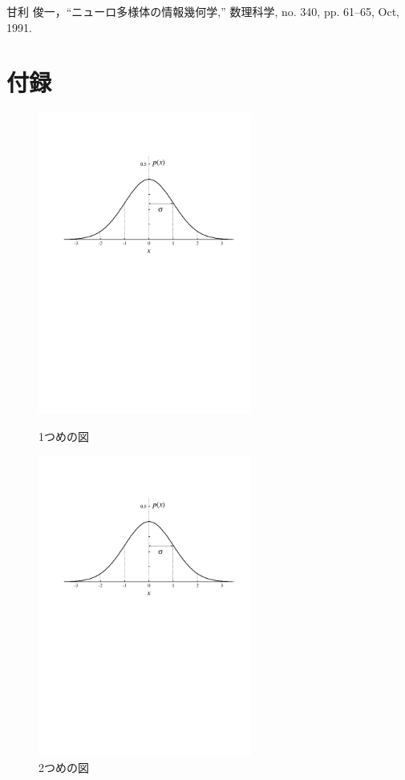\documentclass[a4paper,11pt,dvipdfmx]{jarticle}
\begin{document}
%
%
%
%

\begin{thebibliography}{99}  %

甘利 俊一，``ニューロ多様体の情報幾何学,'' 
数理科学, no. 340, pp. 61--65, Oct, 1991.

\end{thebibliography}



\section*{付録}

\begin{figure}[htbp]
 \begin{minipage}{0.5\hsize}
  \begin{center}
   \includegraphics[width=70mm]{gauss001.pdf}
  \end{center}
  \caption{1つめの図}
  \label{fig:one}
 \end{minipage}
 \begin{minipage}{0.5\hsize}
  \begin{center}
   \includegraphics[width=70mm]{gauss001.pdf}
  \end{center}
  \caption{2つめの図}
  \label{fig:two}
 \end{minipage}
\end{figure}
\end{document}
